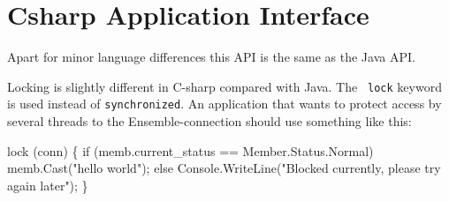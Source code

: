 %
%
%
\section{Csharp Application Interface}
Apart for minor language differences this API is the same as the Java
API. 

Locking is slightly different in C-sharp compared with Java. The {\tt
  lock} keyword is used instead of {\tt synchronized}. An application
that wants to protect access by several threads to the
Ensemble-connection should use something like this: 
\begin{codebox}
  lock (conn) 
  \{
      if (memb.current_status == Member.Status.Normal)
          memb.Cast("hello world");
       else
           Console.WriteLine("Blocked currently, please try again later");
  \}
\end{codebox}

